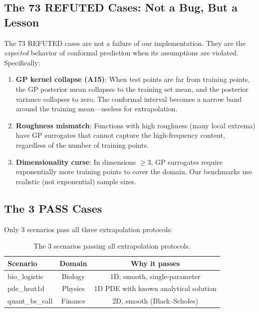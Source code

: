 \documentclass[journal]{IEEEtran}
\begin{document}
\subsection{The 73 REFUTED Cases: Not a Bug, But a Lesson}

The 73 REFUTED cases are not a failure of our implementation. They are the
\textit{expected} behavior of conformal prediction when its assumptions are
violated. Specifically:

\begin{enumerate}
    \item \textbf{GP kernel collapse (A15)}: When test points are far from
    training points, the GP posterior mean collapses to the training set mean,
    and the posterior variance collapses to zero. The conformal interval
    becomes a narrow band around the training mean---useless for extrapolation.
    \item \textbf{Roughness mismatch}: Functions with high roughness (many
    local extrema) have GP surrogates that cannot capture the high-frequency
    content, regardless of the number of training points.
    \item \textbf{Dimensionality curse}: In dimensions $\geq 3$, GP surrogates
    require exponentially more training points to cover the domain. Our
    benchmarks use realistic (not exponential) sample sizes.
\end{enumerate}

\subsection{The 3 PASS Cases}

Only 3 scenarios pass all three extrapolation protocols:

\begin{table}[!t]
\caption{The 3 scenarios passing all extrapolation protocols.}
\label{tab:pass_cases}
\centering
\begin{tabular}{lcc}
\toprule
\textbf{Scenario} & \textbf{Domain} & \textbf{Why it passes} \\
\midrule
bio\_logistic & Biology & 1D, smooth, single-parameter \\
pde\_heat1d & Physics & 1D PDE with known analytical solution \\
quant\_bs\_call & Finance & 2D, smooth (Black--Scholes) \\
\bottomrule
\end{tabular}
\end{table}
\end{document}
